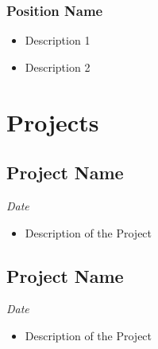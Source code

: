 \documentclass{article}
\renewcommand{\date}[1]{
    \hfill{\normalsize\textit{#1}}
}
\begin{document}
        \subsubsection{Position Name}
            \begin{itemize}
                \item Description 1
                \item Description 2
            \end{itemize}


    \section{Projects} 
        \subsection{Project Name}\date{Date}
            \begin{itemize}
                \item Description of the Project
            \end{itemize}
        \subsection{Project Name}\date{Date}
            \begin{itemize}
                \item Description of the Project
            \end{itemize}
\end{document}
